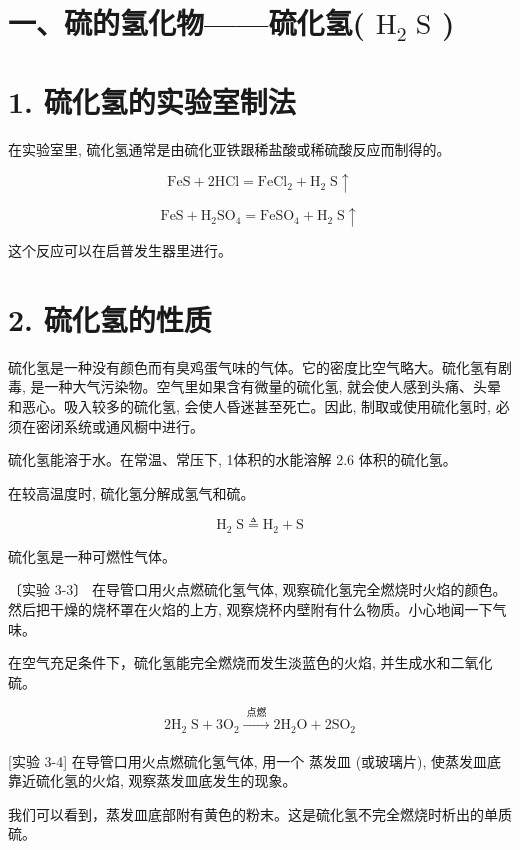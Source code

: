 \documentclass[10pt]{article}
\begin{document}
\section*{一、硫的氢化物——硫化氢( \({\mathrm{H}}_{2}\mathrm{\;S}\) )}

\section*{1. 硫化氢的实验室制法}

在实验室里, 硫化氢通常是由硫化亚铁跟稀盐酸或稀硫酸反应而制得的。

\[
\mathrm{{FeS}} + 2\mathrm{{HCl}} = {\mathrm{{FeCl}}}_{2} + {\mathrm{H}}_{2}\mathrm{\;S} \uparrow
\]

\[
\mathrm{{FeS}} + {\mathrm{H}}_{2}{\mathrm{{SO}}}_{4} = {\mathrm{{FeSO}}}_{4} + {\mathrm{H}}_{2}\mathrm{\;S} \uparrow
\]

这个反应可以在启普发生器里进行。

\section*{2. 硫化氢的性质}

硫化氢是一种没有颜色而有臭鸡蛋气味的气体。它的密度比空气略大。硫化氢有剧毒, 是一种大气污染物。空气里如果含有微量的硫化氢, 就会使人感到头痛、头晕和恶心。吸入较多的硫化氢, 会使人昏迷甚至死亡。因此, 制取或使用硫化氢时, 必须在密闭系统或通风橱中进行。

硫化氢能溶于水。在常温、常压下, 1体积的水能溶解 2.6 体积的硫化氢。

在较高温度时, 硫化氢分解成氢气和硫。

\[
{\mathrm{H}}_{2}\mathrm{\;S} \triangleq {\mathrm{H}}_{2} + \mathrm{S}
\]

硫化氢是一种可燃性气体。

〔实验 3-3〕 在导管口用火点燃硫化氢气体, 观察硫化氢完全燃烧时火焰的颜色。然后把干燥的烧杯罩在火焰的上方, 观察烧杯内壁附有什么物质。小心地闻一下气味。

在空气充足条件下，硫化氢能完全燃烧而发生淡蓝色的火焰, 并生成水和二氧化硫。

\[
2{\mathrm{H}}_{2}\mathrm{\;S} + 3{\mathrm{O}}_{2}\xrightarrow[]{\text{ 点燃 }}2{\mathrm{H}}_{2}\mathrm{O} + 2{\mathrm{{SO}}}_{2}
\]

[实验 3-4] 在导管口用火点燃硫化氢气体, 用一个 蒸发皿 (或玻璃片), 使蒸发皿底靠近硫化氢的火焰, 观察蒸发皿底发生的现象。

我们可以看到，蒸发皿底部附有黄色的粉末。这是硫化氢不完全燃烧时析出的单质硫。
\end{document}
